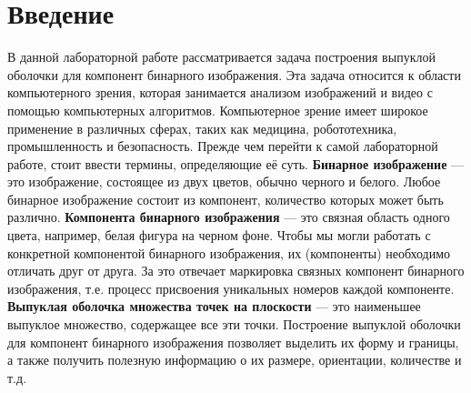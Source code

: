 \section{Введение}
В данной лабораторной работе рассматривается задача построения выпуклой оболочки для компонент бинарного изображения. Эта задача относится к области компьютерного зрения, которая занимается анализом изображений и видео с помощью компьютерных алгоритмов. Компьютерное зрение имеет широкое применение в различных сферах, таких как медицина, робототехника, промышленность и безопасность.\n
Прежде чем перейти к самой лабораторной работе, стоит ввести термины, определяющие её суть.\n
\textbf{Бинарное изображение} — это изображение, состоящее из двух цветов, обычно черного и белого. Любое бинарное изображение состоит из компонент, количество которых может быть различно.\n
\textbf{Компонента бинарного изображения} — это связная область одного цвета, например, белая фигура на черном фоне. Чтобы мы могли работать с конкретной компонентой бинарного изображения, их (компоненты) необходимо отличать друг от друга. За это отвечает маркировка связных компонент бинарного изображения, т.е. процесс присвоения уникальных номеров каждой компоненте.\n
\textbf{Выпуклая оболочка множества точек на плоскости} — это наименьшее выпуклое множество, содержащее все эти точки. Построение выпуклой оболочки для компонент бинарного изображения позволяет выделить их форму и границы, а также получить полезную информацию о их размере, ориентации, количестве и т.д.